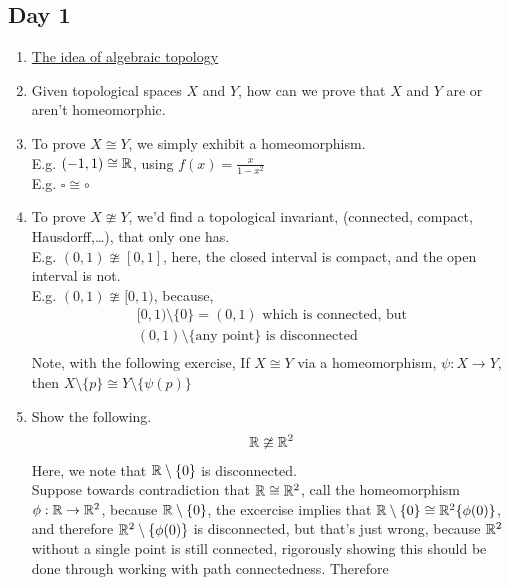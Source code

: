 \subsection{Day 1}
    \begin{enumerate}
        \item \underline{The idea of algebraic topology}
        \item Given topological spaces $X$ and $Y$, how can we prove that $X$ and $Y$ are or aren't homeomorphic.
        \item To prove $X\cong Y$, we simply exhibit a homeomorphism.\\
            E.g. $(-1,1) \cong \mathbb{R}$, using $f(x) = \frac{x}{1-x^2}$\\
            E.g. $\square \cong \circ$
        \item To prove $X\ncong Y$, we'd find a topological invariant, (connected, compact, Hausdorff,\ldots), that only one has.\\
            E.g. $(0,1) \ncong [0,1]$, here, the closed interval is compact, and the open interval is not.\\
            E.g. $(0,1) \ncong [0,1)$, because,\\
            \begin{align*}
                [0,1)\setminus \{0\} = (0,1) \text{ which is connected, but}\\
                (0,1)\setminus \{\text{any point}\} \text{ is disconnected}\\
            \end{align*}
            Note, with the following exercise, If $X\cong Y$ via a homeomorphism, $\psi : X\rightarrow Y$,
            then $X\setminus\{p\}\cong Y\setminus \{\psi(p)\}$
        \item Show the following. \\
            \begin{align*}
                \mathbb{R} \ncong \mathbb{R}^2\\
            \end{align*}
            Here, we note that $\mathbb{R} \setminus \{0\}$ is disconnected.\\
            Suppose towards contradiction that $\mathbb{R} \cong\mathbb{R}^2$, call the homeomorphism $\phi:\mathbb{R}\rightarrow \mathbb{R}^2$, because
            $\mathbb{R}\setminus \{0\}$, the excercise implies that $\mathbb{R}\setminus \{0\}\cong \mathbb{R}^2\{\phi(0)\}$, and therefore
            $\mathbb{R}^2\setminus\{\phi(0)\}$ is disconnected, but that's just wrong, because $\mathbb{R}^2$ without a single point
            is still connected, rigorously showing this should be done through working with path connectedness. Therefore

\end{enumerate}
